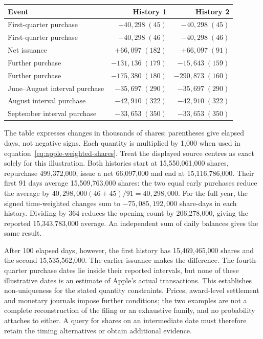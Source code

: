 \begin{center}
\small
\begin{tabular}{@{}lrr@{}}
\toprule
Event & History 1 & History 2 \\
\midrule
First-quarter purchase & $-40{,}298\;(45)$ & $-40{,}298\;(45)$ \\
First-quarter purchase & $-40{,}298\;(46)$ & $-40{,}298\;(46)$ \\
Net issuance & $+66{,}097\;(182)$ & $+66{,}097\;(91)$ \\
Further purchase & $-131{,}136\;(179)$ & $-15{,}643\;(159)$ \\
Further purchase & $-175{,}380\;(180)$ & $-290{,}873\;(160)$ \\
June--August interval purchase & $-35{,}697\;(290)$ & $-35{,}697\;(290)$ \\
August interval purchase & $-42{,}910\;(322)$ & $-42{,}910\;(322)$ \\
September interval purchase & $-33{,}653\;(350)$ & $-33{,}653\;(350)$ \\
\bottomrule
\end{tabular}
\end{center}
The table expresses changes in thousands of shares; parentheses give elapsed
days, not negative signs. Each quantity is multiplied by 1,000 when used in
equation~\eqref{eq:apple-weighted-shares}. Treat the displayed source centres
as exact solely for this illustration. Both histories start at 15,550,061,000
shares, repurchase 499,372,000, issue a net 66,097,000 and end at 15,116,786,000.
Their first 91 days average 15,509,763,000 shares: the two equal early purchases
reduce the average by $40{,}298{,}000(46+45)/91=40{,}298{,}000$.
For the full year, the signed time-weighted changes sum to
$-75{,}085{,}192{,}000$ share-days in each history. Dividing by 364 reduces the
opening count by 206,278,000, giving the reported 15,343,783,000 average.
An independent sum of daily balances gives the same result.

After 100 elapsed days, however, the first history has 15,469,465,000 shares
and the second 15,535,562,000. The earlier issuance makes the difference.
The fourth-quarter purchase dates lie inside their reported intervals, but
none of these illustrative dates is an estimate of Apple's actual transactions.
This establishes non-uniqueness for the stated quantity constraints. Prices,
award-level settlement and monetary journals impose further conditions; the
two examples are not a complete reconstruction of the filing or an exhaustive
family, and no probability attaches to either. A query for shares on an
intermediate date must therefore retain the timing alternatives or obtain
additional evidence.

